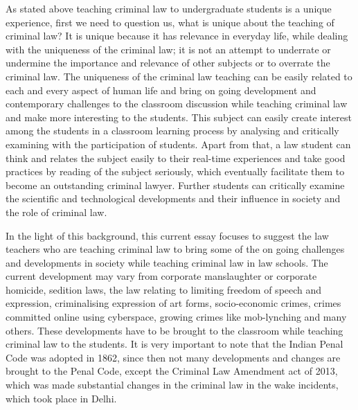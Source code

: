 \begin{multicols}{2}
\noi
As stated above teaching criminal law to undergraduate students is a unique
experience, first we need to question us, what is unique about the teaching of criminal
law? It is unique because it has relevance in everyday life, while dealing with the
uniqueness of the criminal law; it is not an attempt to underrate or undermine the
importance and relevance of other subjects or to overrate the criminal law. The
uniqueness of the criminal law teaching can be easily related to each and every aspect
of human life and bring on going development and contemporary challenges to the
classroom discussion while teaching criminal law and make more interesting to the
students. This subject can easily create interest among the students in a classroom
learning process by analysing and critically examining with the participation of
students. Apart from that, a law student can think and relates the subject easily to their
real-time experiences and take good practices by reading of the subject seriously,
which eventually facilitate them to become an outstanding criminal lawyer. Further
students can critically examine the scientific and technological developments and
their influence in society and the role of criminal law.

\noi
In the light of this background, this current essay focuses to suggest the law teachers
who are teaching criminal law to bring some of the on going challenges and
developments in society while teaching criminal law in law schools. The current
development may vary from corporate manslaughter or corporate homicide, sedition
laws, the law relating to limiting freedom of speech and expression, criminalising
expression of art forms, socio-economic crimes, crimes committed online using
cyberspace, growing crimes like mob-lynching and many others. These developments
have to be brought to the classroom while teaching criminal law to the students. It is
very important to note that the Indian Penal Code was adopted in 1862, since then not
many developments and changes are brought to the Penal Code, except the Criminal
Law Amendment act of 2013, which was made substantial changes in the criminal
law in the wake incidents, which took place in Delhi.


\end{multicols}
